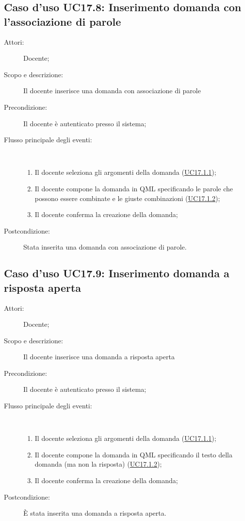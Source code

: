 \subsection{Caso d'uso UC17.8: Inserimento domanda con l'associazione di parole}\begin{description}
	\item[Attori:] Docente;
	\item[Scopo e descrizione:] Il docente inserisce una domanda con associazione di parole
	\item[Precondizione:] Il docente è autenticato presso il sistema;
	
	\item[Flusso principale degli eventi:] \ 
	\begin{enumerate}
		\item Il docente seleziona gli argomenti della domanda (\hyperlink{UC17.1.1}{UC17.1.1});
		\item Il docente compone la domanda in QML specificando le parole che possono essere combinate e le giuste combinazioni (\hyperlink{UC17.1.2}{UC17.1.2});
		\item Il docente conferma la creazione della domanda;
		
	\end{enumerate}
	\item[Postcondizione:] Stata inserita una domanda con associazione di parole.
\end{description}
\hypertarget{UC17.9}{}
\subsection{Caso d'uso UC17.9: Inserimento domanda a risposta aperta}\begin{description}
	\item[Attori:] Docente;
	\item[Scopo e descrizione:] Il docente inserisce una domanda a risposta aperta
	\item[Precondizione:] Il docente è autenticato presso il sistema;
	
	\item[Flusso principale degli eventi:] \ 
	\begin{enumerate}
		\item Il docente seleziona gli argomenti della domanda (\hyperlink{UC17.1.1}{UC17.1.1});
		\item Il docente compone la domanda in QML specificando il testo della domanda (ma non la risposta) (\hyperlink{UC17.1.2}{UC17.1.2});
		\item Il docente conferma la creazione della domanda;
		
	\end{enumerate}
	\item[Postcondizione:] È stata inserita una domanda a risposta aperta.
\end{description}
\hypertarget{UC17.10}{}
